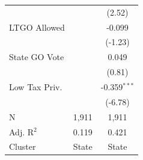 \begin{tabular*}{\textwidth}{@{\extracolsep{\fill}}lcc}
                               &               & (2.52)\\   
   LTGO Allowed                &               & -0.099\\   
                               &               & (-1.23)\\   
   State GO Vote               &               & 0.049\\   
                               &               & (0.81)\\   
   Low Tax Priv.               &               & -0.359$^{***}$\\   
                               &               & (-6.78)\\   
   \hline
   N                & 1,911         & 1,911\\  
   Adj. R$^2$              & 0.119         & 0.421\\  
   Cluster              & State & State\\  
   \bottomrule
\end{tabular*}
\par\endgroup
